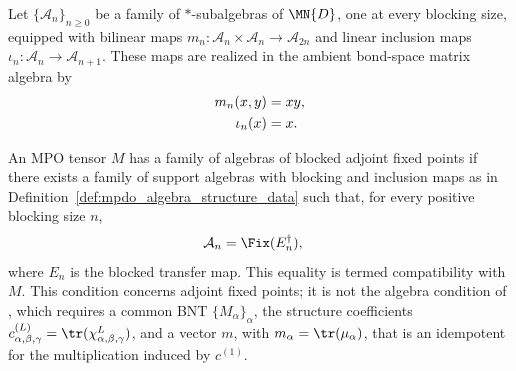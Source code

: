 
\begin{definition}%
    \label{def:mpdo_algebra_structure_data}
    \leanok
    Let $\{\mathcal{A}_n\}_{n \ge 0}$ be a family of $*$-subalgebras of
    $\MN{D}$, one at every blocking size, equipped with bilinear maps
    $m_n : \mathcal{A}_n \times \mathcal{A}_n \to \mathcal{A}_{2n}$ and
    linear inclusion maps $\iota_n : \mathcal{A}_n \to \mathcal{A}_{n+1}$.
    These maps are realized in the ambient bond-space matrix algebra by
    \begin{align}
        m_n(x,y)   & = xy, \notag \\
        \iota_n(x) & = x.
        \notag
    \end{align}
\end{definition}

\begin{definition}%
    \label{def:mpdo_blocked_fixed_point_algebra_tower}
    \leanok
    An MPO tensor $M$ has a family of algebras of blocked adjoint fixed points
    if there exists a family of support algebras with blocking and inclusion
    maps as in Definition~\ref{def:mpdo_algebra_structure_data} such that, for
    every positive blocking size $n$,
    \begin{align}
        \mathcal{A}_n & = \Fix(E_n^{\dagger}),
        \notag
    \end{align}
    where $E_n$ is the blocked transfer map. This equality is termed
    compatibility with $M$. This condition concerns adjoint fixed points;
    it is not the algebra condition of
    \cite[Theorem~4.14(ii)]{Cirac2016MPDO_arXiv}, which requires a common
    BNT $\{M_\alpha\}_\alpha$, the structure coefficients
    $c_{\alpha,\beta,\gamma}^{(L)}=\tr(\chi_{\alpha,\beta,\gamma}^{L})$,
    and a vector $m$, with $m_\alpha=\tr(\mu_\alpha)$, that is an idempotent
    for the multiplication induced by $c^{(1)}$.
\end{definition}

